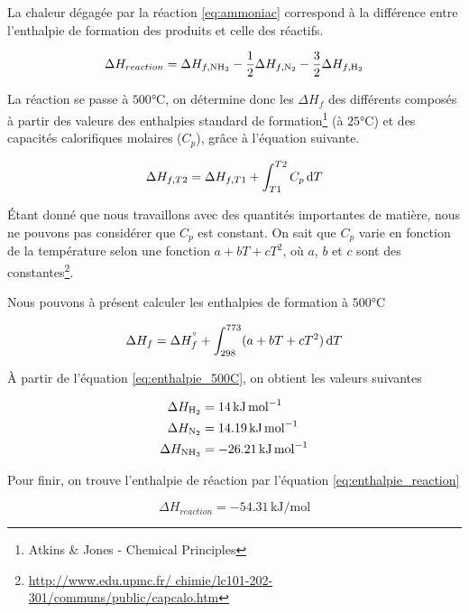 \documentclass[a4paper, oneside, 12pt]{article}
\begin{document}
La chaleur dégagée par la réaction \ref{eq:ammoniac} correspond à la 
différence entre l'enthalpie de formation des produits et celle des réactifs. 

\begin{equation}
	\Delta H_{reaction} = \Delta H_{f, \ce{NH3}} 
	- \frac{1}{2} \Delta H_{f, \ce{N2}}
	- \frac{3}{2} \Delta H_{f, \ce{H2}}
	\label{eq:enthalpie_reaction}
\end{equation}

La réaction se passe à $500 \si{\degreeCelsius}$, 
on détermine donc les $\Delta H_{f}$ des différents 
composés à partir des valeurs des enthalpies standard
de formation\footnote{Atkins \& Jones - Chemical Principles}
(à $25 \si{\degreeCelsius}$)
et des capacités calorifiques molaires ($C_p$), gr\^ace 
à l'équation suivante.

\begin{equation*}
	\Delta H_{f, T2} = \Delta H_{f, T1} 
	+ \int_{T1}^{T2} C_p \, \mathrm{d}T
\end{equation*}

Étant donné que nous travaillons avec des quantités importantes de matière,
nous ne pouvons pas considérer que $C_p$ est constant.
On sait que $C_p$ varie en fonction de la température 
selon une fonction $a + b T + c T^2$, 
où $a$, $b$ et $c$ sont des constantes\footnote{\url{http://www.edu.upmc.fr/
chimie/lc101-202-301/communs/public/capcalo.htm}}. 

Nous pouvons à présent calculer les enthalpies 
de formation à $500 \si{\degreeCelsius}$

\begin{equation}
	\Delta H_f = \Delta H_{f}^{\si{\degree}} + 
	\int_{298}^{773} (a + b T + c T^2) \, \mathrm{d}T
	\label{eq:enthalpie_500C}
\end{equation}

À partir de l'équation \ref{eq:enthalpie_500C}, 
on obtient les valeurs suivantes

\begin{align*}
	\Delta H_{\ce{H2}} &= 14 \, \si{\kilo\joule\per\mole} \\
	\Delta H_{\ce{N2}} &= 14.19 \, \si{\kilo\joule\per\mole} \\
	\Delta H_{\ce{NH3}} &= -26.21 \, \si{\kilo\joule\per\mole} 
\end{align*}

Pour finir, on trouve l'enthalpie de réaction par l'équation \ref{eq:enthalpie_reaction}

\[
	\Delta H_{reaction} = -54.31 \, \si{\kilo\joule\per\mole}
\]
\end{document}
